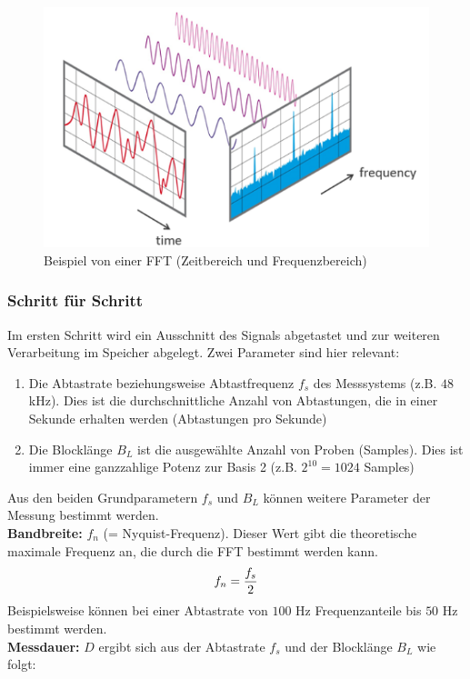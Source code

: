 \begin{figure}
	\centering
	\includegraphics[width=0.5\linewidth]{Bilder/FFTBeispiel.png}
	\caption{Beispiel von einer FFT (Zeitbereich und Frequenzbereich)\citep{NTIAudioFFT}}
	\label{fig:FFTBeispiel}
\end{figure}

\subsubsection{Schritt für Schritt}
Im ersten Schritt wird ein Ausschnitt des Signals abgetastet und zur weiteren Verarbeitung im Speicher abgelegt. Zwei Parameter sind hier relevant:
\begin{enumerate}
	\item Die Abtastrate beziehungsweise Abtastfrequenz $f_s$ des Messsystems (z.B. $48$ kHz). Dies ist die durchschnittliche Anzahl von Abtastungen, die in einer Sekunde erhalten werden (Abtastungen pro Sekunde)
	\item Die Blocklänge $B_L$ ist die ausgewählte Anzahl von Proben (Samples). Dies ist immer eine ganzzahlige Potenz zur Basis 2 (z.B. $2^{10}=1024$ Samples)
\end{enumerate}
Aus den beiden Grundparametern $f_s$ und $B_L$ können weitere Parameter der Messung bestimmt werden. \\
\textbf{Bandbreite:}  $f_n$ (= Nyquist-Frequenz). Dieser Wert gibt die theoretische maximale Frequenz an, die durch die FFT bestimmt werden kann.
\begin{align}
	\centering
	f_n = \frac{f_s}{2}
	\label{gl:Nyquist-Frequenz}
\end{align}
Beispielsweise können bei einer Abtastrate von $100$ Hz Frequenzanteile bis $50$ Hz bestimmt werden.\\
\textbf{Messdauer:} $D$ ergibt sich aus der Abtastrate $f_s$ und der Blocklänge $B_L$ wie folgt:


